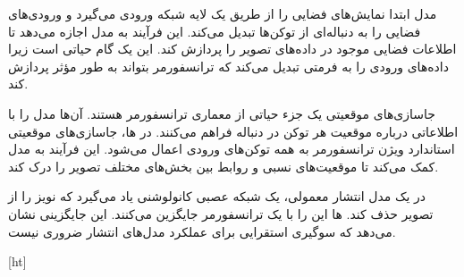 
مدل ابتدا نمایش‌های فضایی را از طریق یک لایه شبکه ورودی می‌گیرد و ورودی‌های فضایی را به دنباله‌ای از توکن‌ها تبدیل می‌کند. این فرآیند به مدل اجازه می‌دهد تا اطلاعات فضایی موجود در داده‌های تصویر را پردازش کند. این یک گام حیاتی است زیرا داده‌های ورودی را به فرمتی تبدیل می‌کند که ترانسفورمر بتواند به طور مؤثر پردازش کند.

جاسازی‌های موقعیتی یک جزء حیاتی از معماری ترانسفورمر هستند. آن‌ها مدل را با اطلاعاتی درباره موقعیت هر توکن در دنباله فراهم می‌کنند. در ها، جاسازی‌های موقعیتی استاندارد ویژن ترانسفورمر به همه توکن‌های ورودی اعمال می‌شود. این فرآیند به مدل کمک می‌کند تا موقعیت‌های نسبی و روابط بین بخش‌های مختلف تصویر را درک کند.

در یک مدل انتشار معمولی، یک شبکه عصبی کانولوشنی یاد می‌گیرد که نویز را از تصویر حذف کند. ها این  را با یک ترانسفورمر جایگزین می‌کنند. این جایگزینی نشان می‌دهد که سوگیری استقرایی  برای عملکرد مدل‌های انتشار ضروری نیست.


[ht]
